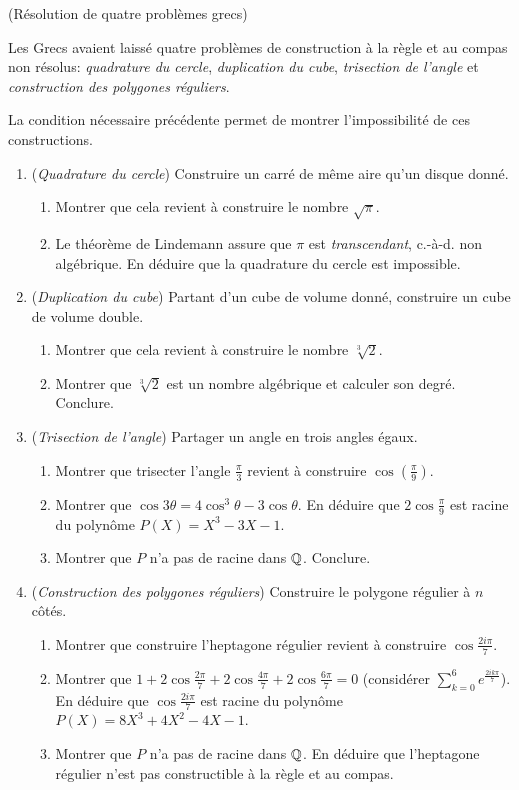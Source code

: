 \documentclass[a4paper,11pt,reqno]{amsart}
\begin{document}
\begin{exo}  (Résolution de quatre problèmes grecs)

  Les Grecs avaient laissé quatre problèmes de construction à la règle et au compas non résolus: \emph{quadrature du cercle}, \emph{duplication du cube}, \emph{trisection de l'angle} et \emph{construction des polygones réguliers}.

  La condition nécessaire précédente permet de montrer l'impossibilité de ces constructions.
  \begin{enumerate}
    \item (\emph{Quadrature du cercle}) Construire un carré de même aire qu'un disque donné.
    \begin{enumerate}
      \item Montrer que cela revient à construire le nombre $\sqrt{\pi}$.
      \item Le théorème de Lindemann assure que $\pi$ est \emph{transcendant}, c.-à-d. non algébrique. En déduire que la quadrature du cercle est impossible.
    \end{enumerate}
    \item (\emph{Duplication du cube}) Partant d'un cube de volume donné, construire un cube de volume double.
    \begin{enumerate}
      \item Montrer que cela revient à construire le nombre $\sqrt[3]{2}$.
      \item Montrer que $\sqrt[3]{2}$ est un nombre algébrique et calculer son degré. Conclure.
    \end{enumerate}
    \item (\emph{Trisection de l'angle})  Partager un angle en trois angles égaux.
    \begin{enumerate}
      \item Montrer que trisecter l'angle $\frac{\pi}{3}$ revient à construire $\cos(\frac{\pi}{9})$.
      \item Montrer que $\cos 3\theta = 4 \cos^3 \theta -3 \cos \theta$. En déduire que $2 \cos \frac{\pi}{9}$ est racine du polynôme $P(X)=X^3-3X-1$.
      \item Montrer que $P$ n'a pas de racine dans $\mathbb{Q}$. Conclure.
    \end{enumerate}
    \item (\emph{Construction des polygones réguliers}) Construire le polygone régulier à $n$ côtés.
    \begin{enumerate}
      \item Montrer que construire l'heptagone régulier revient à construire $\cos\frac{2i\pi}{7}$.
      \item Montrer que $1+2\cos\frac{2\pi}{7}+2\cos\frac{4\pi}{7}+2\cos\frac{6\pi}{7}=0$ (considérer $\sum_{k=0}^6 e^{\frac{2ik\pi}{7}}$). En déduire que $\cos\frac{2i\pi}{7}$ est racine du polynôme $P(X)=8X^3+4X^2-4X-1$.
      \item Montrer que $P$ n'a pas de racine dans $\mathbb{Q}$. En déduire que l'heptagone régulier n'est pas constructible à la règle et au compas.
    \end{enumerate}
  \end{enumerate}
\end{exo}
\end{document}
